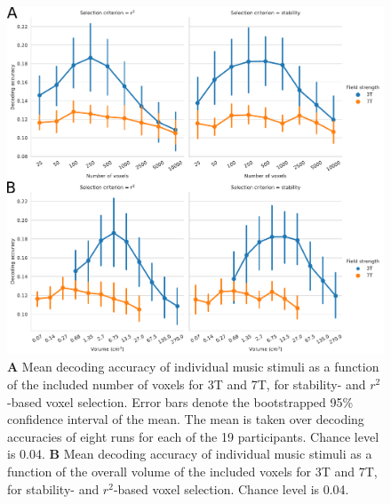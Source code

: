 \begin{figure}
  \centering
    \includegraphics[width=\linewidth]{pics/decoding.pdf}

	\caption{\textbf{A} Mean decoding accuracy of individual music stimuli as a function of
  the included number of voxels for 3T and 7T, for stability- and
  $r^2$-based voxel selection. Error bars denote the bootstrapped 95\%
  confidence interval of the mean. The mean is taken over decoding
  accuracies of eight runs for each of the 19 participants. Chance level is
    0.04. \textbf{B} Mean
decoding accuracy of individual music stimuli as a function of the overall volume of the
included voxels for 3T and 7T, for stability- and $r^2$-based voxel
selection. Chance level is 0.04.
}
 \label{fig:decoding_accuracy_stimulus}
\end{figure}

